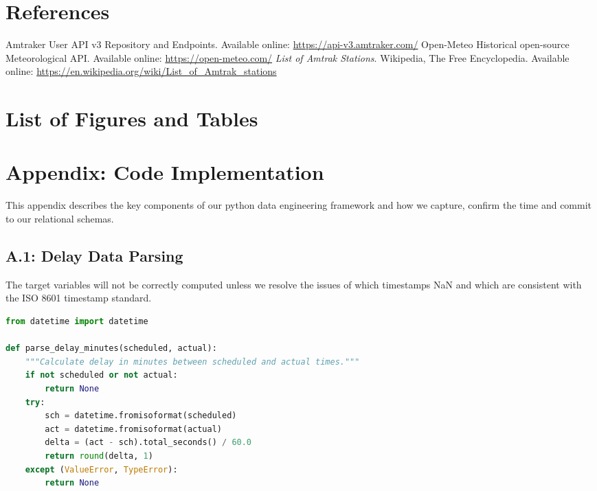 \documentclass[11pt]{article}
\begin{document}
\vspace{1cm}
\renewcommand{\refname}{}
\section{References}
\vspace{-1.5cm}
\begin{thebibliography}{9}
     Amtraker User API v3 Repository and Endpoints. Available online: \url{https://api-v3.amtraker.com/}
     Open-Meteo Historical open-source Meteorological API. Available online: \url{https://open-meteo.com/}
     \textit{List of Amtrak Stations}. Wikipedia, The Free Encyclopedia. Available online: \url{https://en.wikipedia.org/wiki/List_of_Amtrak_stations}
\end{thebibliography}

\clearpage
\renewcommand{\listfigurename}{}
\renewcommand{\listtablename}{}
\section{List of Figures and Tables}
\vspace{-1.5cm}
\listoffigures
\vspace{0.5cm}
\listoftables

\section*{Appendix: Code Implementation}

This appendix describes the key components of our python data engineering framework and how we capture, confirm the time and commit to our relational schemas.


\subsection*{A.1:  Delay Data Parsing}
The target variables will not be correctly computed unless we resolve the issues of which timestamps NaN and which are consistent with the ISO 8601 timestamp standard.


\begin{lstlisting}[language=Python, caption=Parsing and executing chronological metrics natively via datetime libraries.]
from datetime import datetime

def parse_delay_minutes(scheduled, actual):
    """Calculate delay in minutes between scheduled and actual times."""
    if not scheduled or not actual:
        return None
    try:
        sch = datetime.fromisoformat(scheduled)
        act = datetime.fromisoformat(actual)
        delta = (act - sch).total_seconds() / 60.0
        return round(delta, 1)
    except (ValueError, TypeError):
        return None
\end{lstlisting}
\end{document}
